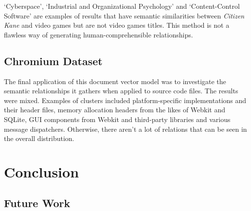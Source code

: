 \documentclass[11pt]{article}
\begin{document}
`Cyberspace', `Industrial and Organizational Psychology' and `Content-Control Software' are examples of results that have semantic similarities between \emph{Citizen Kane} and video games but are not video games titles. This method is not a flawless way of generating human-comprehensible relationships.

\subsection*{Chromium Dataset}

The final application of this document vector model was to investigate the semantic relationships it gathers when applied to source code files. The results were mixed. Examples of clusters included platform-specific implementations and their header files, memory allocation headers from the likes of Webkit and SQLite, GUI components from Webkit and third-party libraries and various message dispatchers. Otherwise, there aren't a lot of relations that can be seen in the overall distribution.

\section*{Conclusion}


\subsection*{Future Work}

\printbibliography
\end{document}

